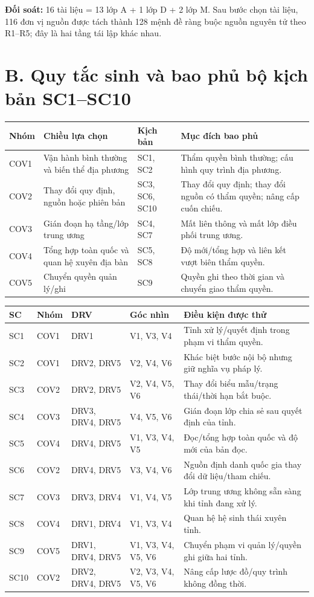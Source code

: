 \documentclass[10pt]{article}
\newcommand{\smallhead}[1]{\textbf{#1}}
\begin{document}
\vfill
\textbf{Đối soát:} 16 tài liệu = 13 lớp A + 1 lớp D + 2 lớp M. Sau bước chọn tài liệu, 116 đơn vị nguồn được tách thành 128 mệnh đề ràng buộc nguồn nguyên tử theo R1--R5; đây là hai tầng tái lập khác nhau.
\newpage

\section*{B. Quy tắc sinh và bao phủ bộ kịch bản SC1--SC10}
\begin{tabularx}{\textwidth}{@{}p{1.4cm}p{5.0cm}p{2.8cm}Y@{}}
\toprule
\smallhead{Nhóm} & \smallhead{Chiều lựa chọn} & \smallhead{Kịch bản} & \smallhead{Mục đích bao phủ} \\
\midrule
COV1 & Vận hành bình thường và biến thể địa phương & SC1, SC2 & Thẩm quyền bình thường; cấu hình quy trình địa phương. \\
COV2 & Thay đổi quy định, nguồn hoặc phiên bản & SC3, SC6, SC10 & Thay đổi quy định; thay đổi nguồn có thẩm quyền; nâng cấp cuốn chiếu. \\
COV3 & Gián đoạn hạ tầng/lớp trung ương & SC4, SC7 & Mất liên thông và mất lớp điều phối trung ương. \\
COV4 & Tổng hợp toàn quốc và quan hệ xuyên địa bàn & SC5, SC8 & Độ mới/tổng hợp và liên kết vượt biên thẩm quyền. \\
COV5 & Chuyển quyền quản lý/ghi & SC9 & Quyền ghi theo thời gian và chuyển giao thẩm quyền. \\
\bottomrule
\end{tabularx}

\vspace{7pt}
\begin{tabularx}{\textwidth}{@{}p{1.0cm}p{1.9cm}p{2.6cm}p{2.8cm}Y@{}}
\toprule
\smallhead{SC} & \smallhead{Nhóm} & \smallhead{DRV} & \smallhead{Góc nhìn} & \smallhead{Điều kiện được thử} \\
\midrule
SC1 & COV1 & DRV1 & V1, V3, V4 & Tỉnh xử lý/quyết định trong phạm vi thẩm quyền. \\
SC2 & COV1 & DRV2, DRV5 & V2, V4, V6 & Khác biệt bước nội bộ nhưng giữ nghĩa vụ pháp lý. \\
SC3 & COV2 & DRV2, DRV5 & V2, V4, V5, V6 & Thay đổi biểu mẫu/trạng thái/thời hạn bắt buộc. \\
SC4 & COV3 & DRV3, DRV4, DRV5 & V4, V5, V6 & Gián đoạn lớp chia sẻ sau quyết định của tỉnh. \\
SC5 & COV4 & DRV4, DRV5 & V1, V3, V4, V5 & Đọc/tổng hợp toàn quốc và độ mới của bản đọc. \\
SC6 & COV2 & DRV4, DRV5 & V3, V4, V6 & Nguồn định danh quốc gia thay đổi dữ liệu/tham chiếu. \\
SC7 & COV3 & DRV3, DRV4 & V1, V4, V5 & Lớp trung ương không sẵn sàng khi tỉnh đang xử lý. \\
SC8 & COV4 & DRV1, DRV4 & V1, V3, V4 & Quan hệ hệ sinh thái xuyên tỉnh. \\
SC9 & COV5 & DRV1, DRV4, DRV5 & V1, V3, V4, V5, V6 & Chuyển phạm vi quản lý/quyền ghi giữa hai tỉnh. \\
SC10 & COV2 & DRV2, DRV4, DRV5 & V2, V3, V4, V5, V6 & Nâng cấp lược đồ/quy trình không đồng thời. \\
\bottomrule
\end{tabularx}
\end{document}
